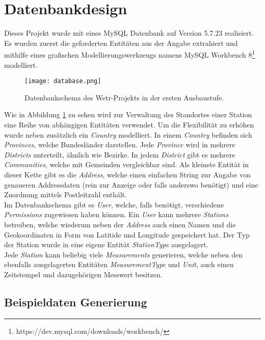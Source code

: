 \section{Datenbankdesign}

Dieses Projekt wurde mit eines MySQL Datenbank auf Version 5.7.23 realisiert. Es wurden zuerst die geforderten Entitäten aus der Angabe extrahiert und mithilfe eines grafischen Modellierungswerkzeugs namens MySQL Workbench 8\footnote{https://dev.mysql.com/downloads/workbench/} modelliert.

\begin{figure}[H]
\centering
\texttt{[image: database.png]}
\caption{Datenbankschema des Wetr-Projekts in der ersten Ausbaustufe.}
\label{fig:db}
\end{figure}
\raggedright

Wie in Abbildung \ref{fig:db} zu sehen wird zur Verwaltung des Standortes einer Station eine Reihe von abhängigen Entitäten verwendet. Um die Flexibilität zu erhöhen wurde neben zusätzlich ein \textit{Country} modelliert. In einem \textit{Country} befinden sich \textit{Provinces}, welche Bundesländer darstellen. Jede \textit{Province} wird in mehrere \textit{Districts} unterteilt, ähnlich wie Bezirke. In jedem \textit{District} gibt es mehrere \textit{Communities}, welche mit Gemeinden vergleichbar sind. Als kleinste Entität in dieser Kette gibt es die \textit{Address}, welche einen einfachen String zur Angabe von genaueren Addressdaten (rein zur Anzeige oder falls anderswo benötigt) und eine Zuordnung mittels Postleitzahl enthält.\\
Im Datenbankschema gibt es \textit{User}, welche, falls benötigt, verschiedene \textit{Permissions} zugewiesen haben können. Ein \textit{User} kann mehrere \textit{Stations} betreiben, welche wiederum neben der \textit{Address} auch einen Namen und die Geokoordinaten in Form von Latitide und Longitude gespeichert hat. Der Typ der Station wurde in eine eigene Entität \textit{StationType} ausgelagert.\\
Jede \textit{Station} kann beliebig viele \textit{Measurements} generieren, welche neben den ebenfalls ausgelagerten Entitäten \textit{MeasurementType} und \textit{Unit}, auch einen Zeitstempel und dazugehörigen Messwert besitzen.\\

\subsection{Beispieldaten Generierung}

